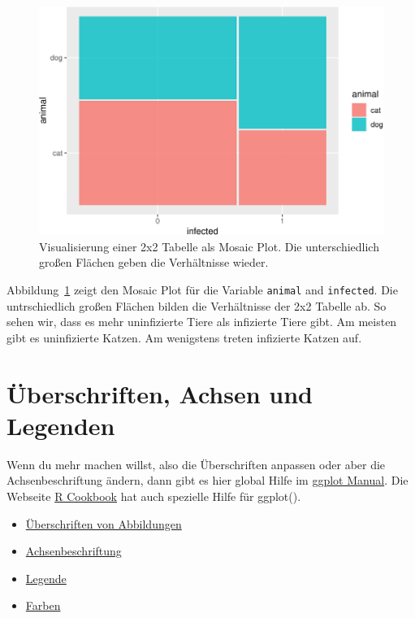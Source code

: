 \documentclass[
  letterpaper,
]{scrbook}
\providecommand{\tightlist}{%
  \setlength{\itemsep}{0pt}\setlength{\parskip}{0pt}}\usepackage{longtable,booktabs,array}
\begin{document}
\begin{figure}[H]

{\centering \includegraphics{./eda-ggplot_files/figure-pdf/fig-mosaic-flea-0-1.pdf}

}

\caption{\label{fig-mosaic-flea-0}Visualisierung einer 2x2 Tabelle als
Mosaic Plot. Die unterschiedlich großen Flächen geben die Verhältnisse
wieder.}

\end{figure}

Abbildung~\ref{fig-mosaic-flea-0} zeigt den Mosaic Plot für die Variable
\texttt{animal} and \texttt{infected}. Die untrschiedlich großen Flächen
bilden die Verhältnisse der 2x2 Tabelle ab. So sehen wir, dass es mehr
uninfizierte Tiere als infizierte Tiere gibt. Am meisten gibt es
uninfizierte Katzen. Am wenigstens treten infizierte Katzen auf.

\hypertarget{uxfcberschriften-achsen-und-legenden}{%
\section{Überschriften, Achsen und
Legenden}\label{uxfcberschriften-achsen-und-legenden}}

Wenn du mehr machen willst, also die Überschriften anpassen oder aber
die Achsenbeschriftung ändern, dann gibt es hier global Hilfe im
\href{https://ggplot2.tidyverse.org/reference/index.html}{ggplot
Manual}. Die Webseite
\href{https://ggplot2.tidyverse.org/reference/index.html}{R Cookbook}
hat auch spezielle Hilfe für ggplot().

\begin{itemize}
\tightlist
\item
  \href{http://www.cookbook-r.com/Graphs/Titles_(ggplot2)/}{Überschriften
  von Abbildungen}
\item
  \href{http://www.cookbook-r.com/Graphs/Axes_(ggplot2)/}{Achsenbeschriftung}
\item
  \href{http://www.cookbook-r.com/Graphs/Legends_(ggplot2)/}{Legende}
\item
  \href{http://www.cookbook-r.com/Graphs/Colors_(ggplot2)/}{Farben}
\end{itemize}
\end{document}
